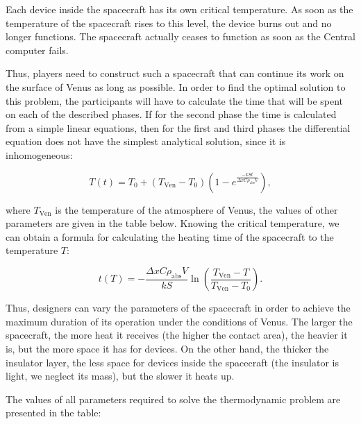 \documentclass[12pt,a4paper]{article}
\begin{document}
Each device inside the spacecraft has its own critical temperature. As soon as the temperature of the spacecraft rises to this level, the device burns out and no longer functions. The spacecraft actually ceases to function as soon as the Central computer fails.

Thus, players need to construct such a spacecraft that can continue its work on the surface of Venus as long as possible. In order to find the optimal solution to this problem, the participants will have to calculate the time that will be spent on each of the described phases. If for the second phase the time is calculated from a simple linear
equations, then for the first and third phases the differential equation does not have the simplest analytical solution, since it is inhomogeneous:

$$
T(t) = T_0 + (T_{\text{Ven}} - T_0)\left(1 - e^{\frac{-k S t}{\Delta x C \rho_{\text{abs}} V}}\right),
$$

where $T_{\text{Ven}}$ is the temperature of the atmosphere of Venus, the values of other parameters are given in the table below. Knowing the critical temperature, we can obtain a formula for calculating the heating time of the spacecraft to the temperature $T$:

$$
t(T) = - \frac{\Delta x C \rho_{\text{abs}} V}{k S} \ln{\left(\frac{T_{\text{Ven}} -
    T}{T_{\text{Ven}} - T_0}\right)}.
$$

Thus, designers can vary the parameters of the spacecraft in order to achieve the maximum duration of its operation under the conditions of Venus. The larger the spacecraft, the more heat it receives (the higher the contact area), the heavier it is, but the more space it has for devices. On the other hand, the thicker the insulator layer, the less space for devices inside the spacecraft (the insulator is light, we neglect its mass), but the slower it heats up.

The values of all parameters required to solve the thermodynamic problem are presented in the table:
\end{document}
